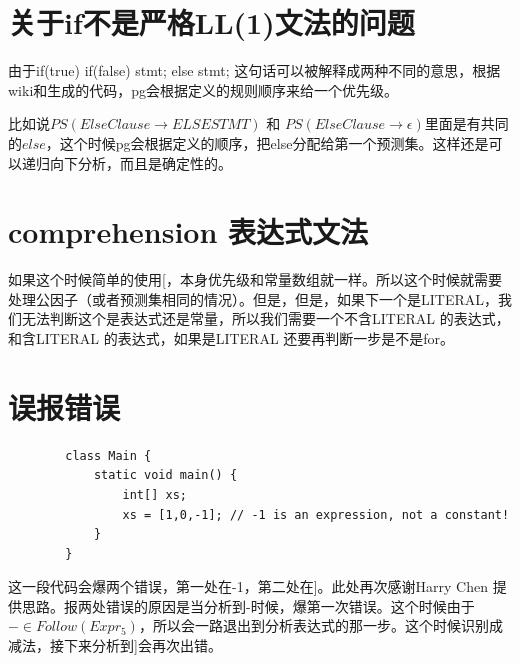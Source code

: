 \documentclass{article}
\theoremstyle{plain}
\theoremstyle{definition}
\begin{document}

    \section{关于if不是严格LL(1)文法的问题}

    由于if(true) if(false) stmt; else stmt; 这句话可以被解释成两种不同的意思，根据wiki和生成的代码，pg会根据定义的规则顺序来给一个优先级。

    比如说$PS(ElseClause \to ELSE STMT)$ 和 $PS(ElseClause\to \epsilon)$里面是有共同的$else$，这个时候pg会根据定义的顺序，把else分配给第一个预测集。这样还是可以递归向下分析，而且是确定性的。

    \section{comprehension 表达式文法}

    如果这个时候简单的使用[，本身优先级和常量数组就一样。所以这个时候就需要处理公因子（或者预测集相同的情况）。但是，但是，如果下一个是LITERAL，我们无法判断这个是表达式还是常量，所以我们需要一个不含LITERAL 的表达式，和含LITERAL 的表达式，如果是LITERAL 还要再判断一步是不是for。

    \section{误报错误}

    \begin{lstlisting}
        class Main {
            static void main() {
                int[] xs;
                xs = [1,0,-1]; // -1 is an expression, not a constant!
            }
        }
    \end{lstlisting}

    这一段代码会爆两个错误，第一处在-1，第二处在]。此处再次感谢Harry Chen 提供思路。报两处错误的原因是当分析到-时候，爆第一次错误。这个时候由于$- \in Follow(Expr_5)$，所以会一路退出到分析表达式的那一步。这个时候识别成减法，接下来分析到]会再次出错。

    
\end{document}
